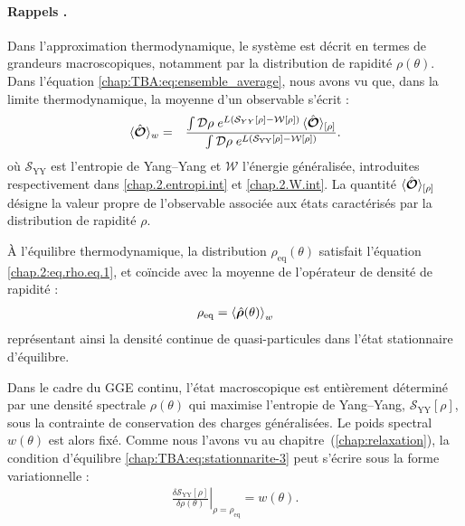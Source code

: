 \begin{mdframed}[
	linewidth=0.5pt, 
	backgroundcolor=gray!5, 
	roundcorner=50pt,	
	innerleftmargin=5pt,
    innerrightmargin=5pt,
    innertopmargin=-10pt,
    innerbottommargin=2pt,
    leftmargin=2pt,
    rightmargin=2pt
	]
\paragraph{Rappels .}

Dans l’approximation thermodynamique, le système est décrit en termes de grandeurs macroscopiques, notamment par la distribution de rapidité $\rho(\theta)$.  
Dans l’équation \eqref{chap:TBA:eq:ensemble_average}, nous avons vu que, dans la limite thermodynamique, la moyenne d’un observable s’écrit :
\begin{eqnarray}
	\langle \hat{\bm{\mathcal{O}}} \rangle_{w} & = & \frac{\int \mathcal{D} \rho \; e^{L (\mathcal{S}_{YY}[\rho] - \mathcal{W}[\rho])} \, \langle\hat{\bm{\mathcal{O}}}\rangle_{[\rho]}}{\int \mathcal{D} \rho \; e^{L (\mathcal{S}_{\mathrm{YY}}[\rho] - \mathcal{W}[\rho])}}. \label{chap:Fluc:eq:ensemble_average}
\end{eqnarray}
où $\mathcal{S}_{\mathrm{YY}}$ est l’entropie de Yang–Yang et $\mathcal{W}$ l’énergie généralisée, introduites respectivement dans \eqref{chap.2.entropi.int} et \eqref{chap.2.W.int}.  
La quantité $\langle\hat{\bm{\mathcal{O}}}\rangle_{[\rho]}$ désigne la valeur propre de l’observable associée aux états caractérisés par la distribution de rapidité $\rho$.

\medskip

À l’équilibre thermodynamique, la distribution $\rho_{\mathrm{eq}}(\theta)$ satisfait l’équation \eqref{chap.2:eq.rho.eq.1}, et coïncide avec la moyenne de l’opérateur de densité de rapidité :
\begin{eqnarray}
	 \rho_{\mathrm{eq}} =  \braket{ \hat{\bm{\rho}}(\theta) }_w	
\end{eqnarray}
représentant ainsi la densité continue de quasi-particules dans l’état stationnaire d’équilibre.

\medskip

Dans le cadre du GGE continu, l’état macroscopique est entièrement déterminé par une densité spectrale $\rho(\theta)$ qui maximise l’entropie de Yang–Yang, $\mathcal{S}_{\mathrm{YY}}[\rho]$, sous la contrainte de conservation des charges généralisées. Le poids spectral $w(\theta)$ est alors fixé.  
Comme nous l’avons vu au chapitre~(\ref{chap:relaxation}), la condition d’équilibre \eqref{chap:TBA:eq:stationnarite-3} peut s’écrire sous la forme variationnelle :
\begin{eqnarray}
	\left. \frac{\delta \mathcal{S}_{\mathrm{YY}}[\rho]}{\delta \rho(\theta)} \right|_{\rho = \rho_{\mathrm{eq}}} = w(\theta). \label{chap:TBA:eq:stationnarite-3}
\end{eqnarray}

\end{mdframed}

